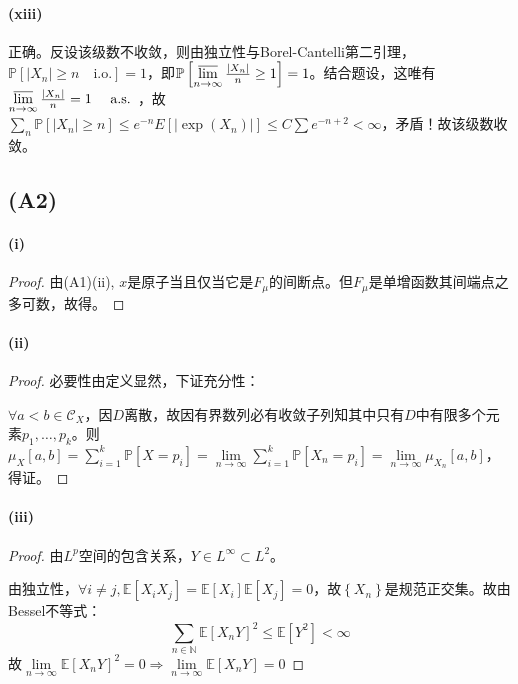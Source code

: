 \documentclass{ctexart}
\begin{document}
\paragraph{(xiii)}
正确。反设该级数不收敛，则由独立性与Borel-Cantelli第二引理，$\mathbb{P}\left[ |X_n| \geq n \quad \mathrm{i.o.}\right]=1$，即$\mathbb{P}\left[ \varlimsup\limits_{n\to\infty}\frac{|X_n|}{n}\geq 1 \right]=1$。结合题设，这唯有$\varlimsup\limits_{n\to\infty}\frac{|X_{n}|}{n}=1 \quad \text{ a.s. }$，故$\sum\limits_{n}^{}\mathbb{P}\left[ |X_{n}|\geq n \right]\leq e^{-n}E[|\exp(X_{n})|]\leq C\sum e^{-n+2}<\infty$，矛盾！故该级数收敛。

\subsection{(A2)}
\paragraph{(i)}
\begin{proof}
  由(A1)(ii), $x$是原子当且仅当它是$F_{\mu}$的间断点。但$F_{\mu}$是单增函数其间端点之多可数，故得。
\end{proof}
\paragraph{(ii)}
\begin{proof}
  必要性由定义显然，下证充分性：
  
  $\forall a<b\in \mathcal{C}_X$，因$D$离散，故因有界数列必有收敛子列知其中只有$D$中有限多个元素$p_1,\dots,p_k$。则$\mu_X[a,b]=\sum\limits_{i=1}^{k}\mathbb{P}\left[ X=p_i \right]=\lim\limits_{n\to\infty}\sum\limits_{i=1}^{k}\mathbb{P}\left[ X_n=p_{i} \right]=\lim\limits_{n\to\infty}\mu_{X_n}[a,b]$，得证。
\end{proof}

\paragraph{(iii)}
\begin{proof}
由$L^p$空间的包含关系，$Y\in L^{\infty}\subset L^2$。
  
  由独立性，$\forall i\neq j, \underset{}{\mathbb{E}}\left[ X_iX_j\right]=\underset{}{\mathbb{E}}\left[ X_i\right]\underset{}{\mathbb{E}}\left[ X_j\right]=0   $，故$\left\{ X_n \right\}$是规范正交集。故由Bessel不等式：
  \begin{equation*}
\sum\limits_{n\in \mathbb{N}}^{}\underset{}{\mathbb{E}}\left[ X_nY\right]^2\leq \underset{}{\mathbb{E}}\left[ Y^2\right]<\infty
\end{equation*}
故$\lim\limits_{n\to\infty}\underset{}{\mathbb{E}}\left[ X_nY\right]^2=0 \Rightarrow \lim\limits_{n\to\infty}\underset{}{\mathbb{E}}\left[ X_nY\right]=0 $
\end{proof}
\end{document}
